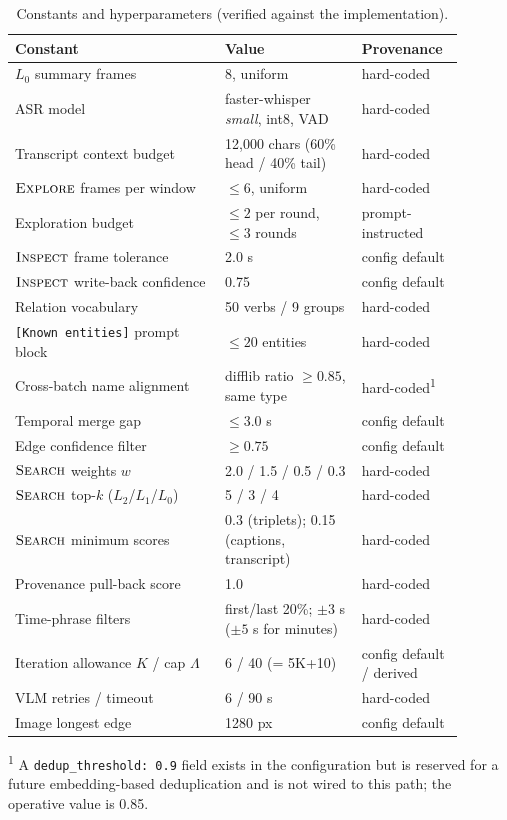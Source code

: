 \begin{table}[t]
  \centering
  \small
  \caption{Constants and hyperparameters (verified against the implementation).}
  \label{tab:constants}
  \setlength{\tabcolsep}{3.5pt}
  \begin{tabular}{@{}p{0.43\linewidth}p{0.29\linewidth}p{0.17\linewidth}@{}}
    \toprule
    Constant & Value & Provenance \\
    \midrule
    $L_0$ summary frames & 8, uniform & hard-coded \\
    ASR model & faster-whisper \emph{small}, int8, VAD & hard-coded \\
    Transcript context budget & 12,000 chars (60\% head / 40\% tail) & hard-coded \\
    $\textsc{Explore}$ frames per window & $\leq 6$, uniform & hard-coded \\
    Exploration budget & $\leq 2$ per round, $\leq 3$ rounds & prompt-instructed \\
    $\textsc{Inspect}$ frame tolerance & 2.0 s & config default \\
    $\textsc{Inspect}$ write-back confidence & 0.75 & config default \\
    Relation vocabulary & 50 verbs / 9 groups & hard-coded \\
    \texttt{[Known entities]} prompt block & $\leq 20$ entities & hard-coded \\
    Cross-batch name alignment & difflib ratio $\geq 0.85$, same type & hard-coded\textsuperscript{1} \\
    Temporal merge gap & $\leq 3.0$ s & config default \\
    Edge confidence filter & $\geq 0.75$ & config default \\
    $\textsc{Search}$ weights $w$ & 2.0 / 1.5 / 0.5 / 0.3 & hard-coded \\
    $\textsc{Search}$ top-$k$ ($L_2$/$L_1$/$L_0$) & 5 / 3 / 4 & hard-coded \\
    $\textsc{Search}$ minimum scores & 0.3 (triplets); 0.15 (captions, transcript) & hard-coded \\
    Provenance pull-back score & 1.0 & hard-coded \\
    Time-phrase filters & first/last 20\%; $\pm 3$ s ($\pm 5$ s for minutes) & hard-coded \\
    Iteration allowance $K$ / cap $\Lambda$ & 6 / 40 (= 5K+10) & config default / derived \\
    VLM retries / timeout & 6 / 90 s & hard-coded \\
    Image longest edge & 1280 px & config default \\
    \bottomrule
  \end{tabular}

  \vspace{2pt}
  {\footnotesize \textsuperscript{1} A \texttt{dedup\_threshold: 0.9} field exists in the configuration but is reserved for a future
  embedding-based deduplication and is not wired to this path; the operative value is 0.85.}
\end{table}
